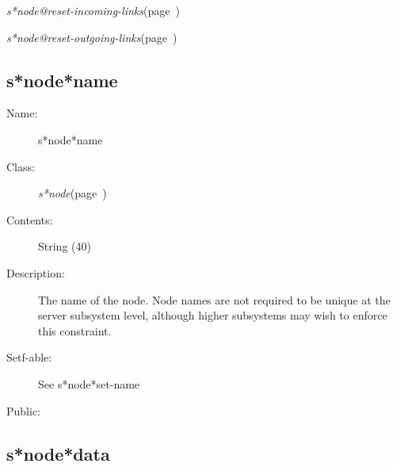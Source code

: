 \begin{description}
\item {\sl s*node@reset-incoming-links}\hfill(page~\pageref{s*node@reset-incoming-links})
\item {\sl s*node@reset-outgoing-links}\hfill(page~\pageref{s*node@reset-outgoing-links})

\item [Collections:]

\item [Subclasses:]

\item [Superclasses:]



\end{description}
\horizontalline

\subsection{s*node*name}
\label{s*node*name}

\begin{description}

\item [Name:]  s*node*name

\item [Class:] {\sl s*node}\hfill(page~\pageref{s*node}) 

\item [Contents:] String (40)

\item [Description:]
The name of the node. Node names are not
required to be unique at the server subsystem
level, although higher subsystems may wish to
enforce this constraint.

\item [Setf-able:] See s*node*set-name

\item [Public:]



\end{description}
\horizontalline

\subsection{s*node*data}
\label{s*node*data}

